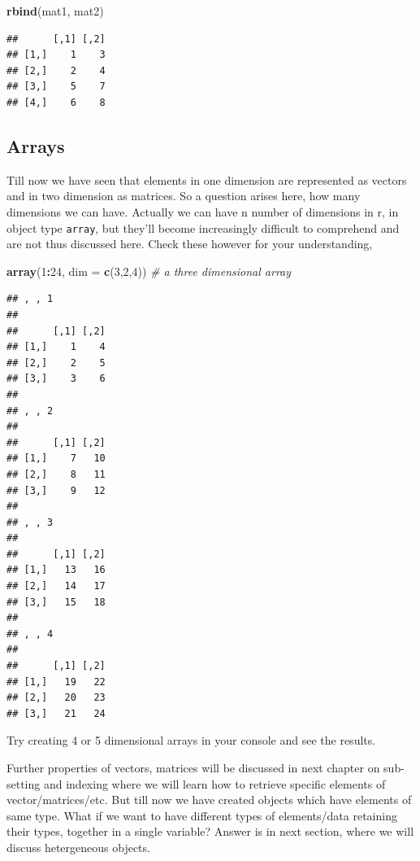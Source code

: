 \documentclass[
]{book}
\newenvironment{Shaded}{\begin{snugshade}}{\end{snugshade}}
\newcommand{\AttributeTok}[1]{\textcolor[rgb]{0.13,0.29,0.53}{#1}}
\newcommand{\CommentTok}[1]{\textcolor[rgb]{0.56,0.35,0.01}{\textit{#1}}}
\newcommand{\DecValTok}[1]{\textcolor[rgb]{0.00,0.00,0.81}{#1}}
\newcommand{\FunctionTok}[1]{\textcolor[rgb]{0.13,0.29,0.53}{\textbf{#1}}}
\newcommand{\NormalTok}[1]{#1}
\newcommand{\SpecialCharTok}[1]{\textcolor[rgb]{0.81,0.36,0.00}{\textbf{#1}}}
\begin{document}
\begin{Shaded}
\begin{Highlighting}[]
\FunctionTok{rbind}\NormalTok{(mat1, mat2)}
\end{Highlighting}
\end{Shaded}

\begin{verbatim}
##      [,1] [,2]
## [1,]    1    3
## [2,]    2    4
## [3,]    5    7
## [4,]    6    8
\end{verbatim}

\hypertarget{arrays}{%
\subsection{Arrays}\label{arrays}}

Till now we have seen that elements in one dimension are represented as vectors and in two dimension as matrices. So a question arises here, how many dimensions we can have. Actually we can have n number of dimensions in r, in object type \texttt{array}, but they'll become increasingly difficult to comprehend and are not thus discussed here. Check these however for your understanding,

\begin{Shaded}
\begin{Highlighting}[]
\FunctionTok{array}\NormalTok{(}\DecValTok{1}\SpecialCharTok{:}\DecValTok{24}\NormalTok{, }\AttributeTok{dim =} \FunctionTok{c}\NormalTok{(}\DecValTok{3}\NormalTok{,}\DecValTok{2}\NormalTok{,}\DecValTok{4}\NormalTok{)) }\CommentTok{\# a three dimensional array}
\end{Highlighting}
\end{Shaded}

\begin{verbatim}
## , , 1
## 
##      [,1] [,2]
## [1,]    1    4
## [2,]    2    5
## [3,]    3    6
## 
## , , 2
## 
##      [,1] [,2]
## [1,]    7   10
## [2,]    8   11
## [3,]    9   12
## 
## , , 3
## 
##      [,1] [,2]
## [1,]   13   16
## [2,]   14   17
## [3,]   15   18
## 
## , , 4
## 
##      [,1] [,2]
## [1,]   19   22
## [2,]   20   23
## [3,]   21   24
\end{verbatim}

Try creating 4 or 5 dimensional arrays in your console and see the results.

Further properties of vectors, matrices will be discussed in next chapter on sub-setting and indexing where we will learn how to retrieve specific elements of vector/matrices/etc. But till now we have created objects which have elements of same type. What if we want to have different types of elements/data retaining their types, together in a single variable? Answer is in next section, where we will discuss hetergeneous objects.
\end{document}
